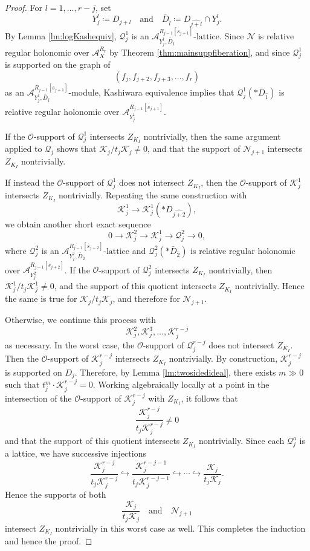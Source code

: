 \documentclass{amsart}
\theoremstyle{plain}
\numberwithin{theorem}{section}
\theoremstyle{definition}
\theoremstyle{remark}
\theoremstyle{definition}
\newcommand{\cK}{\mathcal{K}}
\newcommand{\cN}{\mathcal{N}}
\newcommand{\cO}{\mathscr{O}}
\newcommand{\cQ}{\mathcal{Q}}
\newcommand{\sA}{\mathscr{A}}
\begin{document}
\begin{proof}
For $l=1,\dots,r-j$, set
\[
Y_j^l\coloneqq D_{j+l}
\quad \text{and} \quad
\bar D_{\widehat l}\coloneqq D_{\widehat{j+l}}\cap Y_j^l.
\]
By Lemma \ref{lm:logKashequiv}, $\cQ_j^1$ is an
$\sA_{Y_j^1,\bar D_{\widehat 1}}^{R_{j-1}[s_{j+1}]}\text{-lattice}.$
Since $\cN$ is relative regular holonomic over $\sA_X^{R_r}$ by
Theorem \ref{thm:mainsuppfiberation}, and since $\cQ_j^1$ is supported on the
graph of
\[
(f_j,f_{j+2},f_{j+3},\dots,f_r)
\]
as an $\sA_{Y_j^1,\bar D_{\widehat 1}}^{R_{j-1}[s_{j+1}]}$-module, Kashiwara
equivalence implies that
$\cQ_j^1(*\bar D_{\widehat 1})$
is relative regular holonomic over
$\sA_{Y_j^1}^{R_{j-1}[s_{j+1}]}.$

If the $\cO$-support of $\cQ_j^1$ intersects $Z_{K_I}$ nontrivially, then the
same argument applied to $\cQ_j$ shows that
${\cK_j}/{t_j\cK_j}\neq 0$,
and that the support of $\cN_{j+1}$ intersects $Z_{K_I}$ nontrivially.

If instead the $\cO$-support of $\cQ_j^1$ does not intersect $Z_{K_I}$, then
the $\cO$-support of $\cK_j^1$ intersects $Z_{K_I}$ nontrivially. Repeating
the same construction with
\[
\cK_j^1\to \cK_j^1(*D_{\widehat{j+2}}),
\]
we obtain another short exact sequence
\[
0
\to
\cK_j^2
\to
\cK_j^1
\to
\cQ_j^2
\to
0,
\]
where $\cQ_j^2$ is an
$\sA_{Y_j^2,\bar D_{\widehat 2}}^{R_{j-1}[s_{j+2}]}\text{-lattice}$
and
$\cQ_j^2(*\bar D_{\widehat 2})$
is relative regular holonomic over
$\sA_{Y_j^2}^{R_{j-1}[s_{j+2}]}$.
If the $\cO$-support of $\cQ_j^2$ intersects $Z_{K_I}$ nontrivially, then
${\cK_j^1}/{t_j\cK_j^1}\neq 0$,
and the support of this quotient intersects $Z_{K_I}$ nontrivially. Hence the
same is true for $\cK_j/t_j\cK_j$, and therefore for $\cN_{j+1}$.

Otherwise, we continue this process with
\[
\cK_j^2,\cK_j^3,\dots,\cK_j^{r-j}
\]
as necessary. In the worst case, the $\cO$-support of $\cQ_j^{r-j}$ does not
intersect $Z_{K_I}$. Then the $\cO$-support of $\cK_j^{r-j}$ intersects
$Z_{K_I}$ nontrivially. By construction, $\cK_j^{r-j}$ is supported on
$D_j$. Therefore, by Lemma \ref{lm:twosidedideal}, there exists $m\gg 0$ such
that
$t_j^m\cdot \cK_j^{r-j}=0$.
Working algebraically locally at a point in the intersection of the
$\cO$-support of $\cK_j^{r-j}$ with $Z_{K_I}$, it follows that
\[
\frac{\cK_j^{r-j}}{t_j\cK_j^{r-j}}\neq 0
\]
and that the support of this quotient intersects $Z_{K_I}$ nontrivially.
Since each $\cQ_j^a$ is a lattice, we have successive injections
\[
\frac{\cK_j^{r-j}}{t_j\cK_j^{r-j}}
\hookrightarrow
\frac{\cK_j^{r-j-1}}{t_j\cK_j^{r-j-1}}
\hookrightarrow
\cdots
\hookrightarrow
\frac{\cK_j}{t_j\cK_j}.
\]
Hence the supports of both
\[
\frac{\cK_j}{t_j\cK_j}
\quad \text{and} \quad
\cN_{j+1}
\]
intersect $Z_{K_I}$ nontrivially in this worst case as well. This completes
the induction and hence the proof.
\end{proof}
\end{document}
